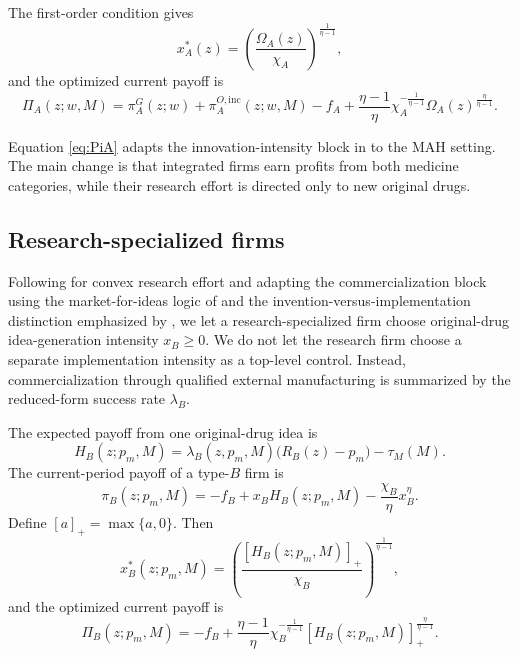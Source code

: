 \documentclass[12pt]{article}
\newcommand{\1}{\mathbf{1}}
\begin{document}
The first-order condition gives
\begin{equation}
x_A^*(z)=\left(\frac{\Omega_A(z)}{\chi_A}\right)^{\frac{1}{\eta-1}},
\label{eq:xA}
\end{equation}
and the optimized current payoff is
\begin{equation}
\Pi_A(z;w,M)
=
\pi_A^G(z;w)
+\pi_A^{O,\mathrm{inc}}(z;w,M)
-f_A
+
\frac{\eta-1}{\eta}\chi_A^{-\frac{1}{\eta-1}}\Omega_A(z)^{\frac{\eta}{\eta-1}}.
\label{eq:PiA}
\end{equation}

Equation \eqref{eq:PiA} adapts the innovation-intensity block in \citet{KletteKortum2004} to the MAH setting. The main change is that integrated firms earn profits from both medicine categories, while their research effort is directed only to new original drugs.

\subsection{Research-specialized firms}

Following \citet{KletteKortum2004} for convex research effort and adapting the commercialization block using the market-for-ideas logic of \citet{GansStern2003} and the invention-versus-implementation distinction emphasized by \citet{FonsRosenRoldanBlancoSchmitz2026}, we let a research-specialized firm choose original-drug idea-generation intensity $x_B\ge 0$. We do not let the research firm choose a separate implementation intensity as a top-level control. Instead, commercialization through qualified external manufacturing is summarized by the reduced-form success rate $\lambda_B$.

The expected payoff from one original-drug idea is
\begin{equation}
H_B(z;p_m,M)=\lambda_B(z,p_m,M)\bigl(R_B(z)-p_m\bigr)-\tau_M(M).
\label{eq:HB}
\end{equation}
The current-period payoff of a type-$B$ firm is
\begin{equation}
\pi_B(z;p_m,M)
=
-f_B+x_B H_B(z;p_m,M)-\frac{\chi_B}{\eta}x_B^{\eta}.
\label{eq:piB}
\end{equation}
Define $[a]_+=\max\{a,0\}$. Then
\begin{equation}
x_B^*(z;p_m,M)=\left(\frac{[H_B(z;p_m,M)]_+}{\chi_B}\right)^{\frac{1}{\eta-1}},
\label{eq:xB}
\end{equation}
and the optimized current payoff is
\begin{equation}
\Pi_B(z;p_m,M)
=
-f_B+
\frac{\eta-1}{\eta}\chi_B^{-\frac{1}{\eta-1}}[H_B(z;p_m,M)]_+^{\frac{\eta}{\eta-1}}.
\label{eq:PiB}
\end{equation}
\end{document}

